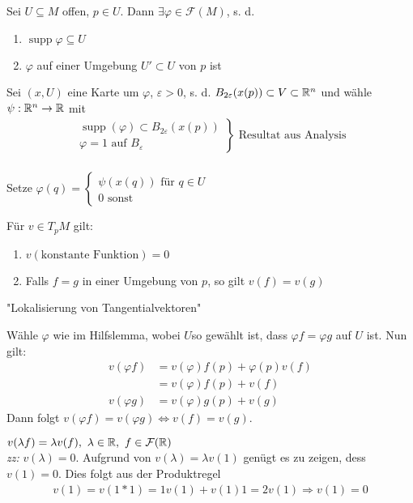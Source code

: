 \begin{hlem}
Sei $U \subseteq M$ offen, $p \in U$. Dann $\exists \varphi \in \mathcal{F}(M)$, s. d. 
\begin{enumerate}
\item$\operatorname{supp}\varphi\subseteq U$
\item$\varphi$ auf einer Umgebung $U' \subset U$ von $p$ ist
\end{enumerate}
\end{hlem}

\begin{bew}
Sei $(x, U)$ eine Karte um $\varphi$, $\varepsilon > 0$, s. d. $B_{2\varepsilon}(x(p))\subset V\subset \mathbb{R}^n$ und wähle $\psi:\mathbb{R}^n\rightarrow\mathbb{R}$ mit 
\begin{align*}
\left.
\begin{array}{r}
\operatorname{supp}(\varphi)\subset B_{2\varepsilon}(x(p))\\
\varphi = 1 \text{ auf } B_\varepsilon
\end{array}
\right\} \text{ Resultat aus Analysis}\\
\end{align*}

Setze $\varphi(q) = \left\{
\begin{array}{l}
\psi(x(q))\text{ für }q\in U\\
0 \text{ sonst}
\end{array}
\right.$
\end{bew}

\begin{satz}
Für $v\in T_p M$ gilt:
\begin{enumerate}
\item$v(\text{konstante Funktion}) = 0$
\item Falls $f = g$ in einer Umgebung von $p$, so gilt $v(f) = v(g)$
\end{enumerate}
"Lokalisierung von Tangentialvektoren"
\end{satz}

\begin{bew}[zu 2]
Wähle $\varphi$ wie im Hilfslemma, wobei $U$so gewählt ist, dass $\varphi f = \varphi g$ auf $U$ ist. Nun gilt:
\begin{align*}
v(\varphi f) &= v(\varphi)f(p) + \varphi(p)v(f)\\
&= v(\varphi)f(p) + v(f)\\
v(\varphi g) &= v(\varphi)g(p) + v(g)
\end{align*}
Dann folgt $v(\varphi f) = v(\varphi g) \Leftrightarrow v(f) = v(g)$.
\end{bew}

\begin{bew}[zu 1]
	$v(\lambda f) = \lambda v(f),\ \lambda \in \mathbb{R},\ f\in \mathcal{F}(\mathbb{R})$\\
	\textit{zz:} $v(\lambda) = 0$. Aufgrund von $v(\lambda) = \lambda v(1)$ genügt es zu zeigen, dess $v(1) = 0$. Dies folgt aus der Produktregel
	\begin{align*}
	v(1) = v(1*1) = 1v(1) + v(1)1 = 2v(1) \Rightarrow v(1) = 0
	\end{align*}
\end{bew}

